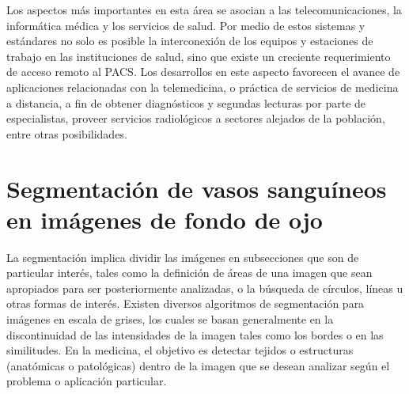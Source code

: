 Los aspectos más importantes en esta \'area se asocian a las telecomunicaciones, la inform\'atica m\'edica y los servicios de salud. Por medio de estos sistemas y est\'andares no solo es posible la interconexi\'on de los equipos y estaciones de trabajo en las instituciones de salud, sino que existe un creciente requerimiento de acceso remoto al PACS. Los desarrollos en este aspecto favorecen el avance de aplicaciones relacionadas con la telemedicina, o pr\'actica de servicios de medicina a distancia, a fin de obtener diagn\'osticos y segundas lecturas por parte de especialistas, proveer servicios radiol\'ogicos a sectores alejados de la poblaci\'on, entre otras posibilidades.


\section{Segmentaci\'on de vasos sangu\'ineos en im\'agenes de fondo de ojo}
La segmentaci\'on implica dividir las im\'agenes en subsecciones que son de particular inter\'es, tales como la definici\'on de \'areas de una imagen que sean apropiados para ser posteriormente analizadas, o la b\'usqueda de c\'irculos, l\'ineas u otras formas de inter\'es. Existen diversos algoritmos de segmentaci\'on para im\'agenes en escala de grises, los cuales se basan generalmente en la discontinuidad de las intensidades de la imagen tales como los bordes o en las similitudes. 
En la medicina, el objetivo es detectar tejidos o estructuras (anat\'omicas o patol\'ogicas) dentro de la imagen que se desean analizar seg\'un el problema o aplicaci\'on particular.



